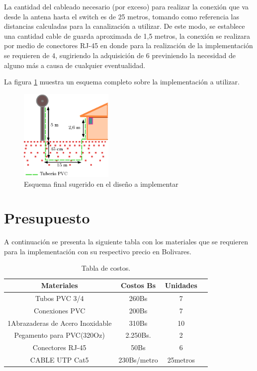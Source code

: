 \documentclass[11pt, a4paper, twosides]{report}
\begin{document}
La cantidad del cableado necesario (por exceso) para realizar la conexión que va desde la antena hasta el switch es de 25 metros, tomando como referencia las distancias calculadas para la canalización a utilizar. De este modo, se establece una cantidad cable de guarda aproximada de 1,5 metros, la conexión se realizara por medio de conectores RJ-45 en donde para la realización de la implementación se requieren de 4, sugiriendo la adquisición de 6 previniendo la necesidad de alguno más a causa de cualquier eventualidad.

La figura \ref{fig:frog3} muestra un esquema completo sobre la implementación a utilizar.
\begin{figure}[h]
    \centering
    \includegraphics[width=0.4\textwidth]{tulo.png}
    \caption{Esquema final sugerido en el diseño a implementar}
    \label{fig:frog3}
\end{figure}

\section{Presupuesto}
A continuación se presenta la siguiente tabla con los materiales que se requieren para la implementación con su respectivo precio en Bolivares.

\begin{table}[h]
    \centering
    \begin{tabular}{ | c | c | c | c | }
    \hline
    	\cellcolor{gray75}\textbf{Materiales} & \cellcolor{gray75}\textbf{Costos Bs} & \cellcolor{gray75}\textbf{Unidades}  \\ \hline
    	Tubos PVC 3/4 & 260Bs & 7  \\ \hline
    	Conexiones PVC & 200Bs & 7 \\ \hline
    	1Abrazaderas de Acero Inoxidable & 310Bs& 10  \\ \hline
    	Pegamento para PVC(320Oz) & 2.250Bs.&    2\\ \hline
        Conectores RJ-45 & 50Bs & 6   \\ \hline
    	CABLE UTP Cat5 & 230Bs/metro & 25metros  \\ \hline
    \end{tabular}
    \caption{Tabla de costos.}
    \label{tab:cost3}
\end{table}
\end{document}
